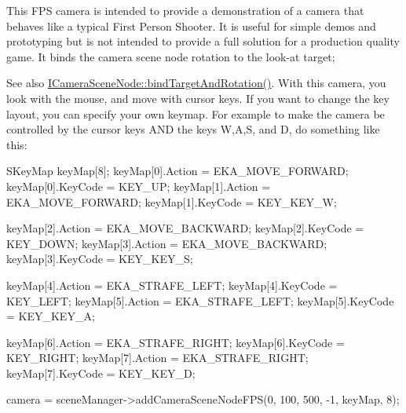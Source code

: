 This F\+PS camera is intended to provide a demonstration of a camera that behaves like a typical First Person Shooter. It is useful for simple demos and prototyping but is not intended to provide a full solution for a production quality game. It binds the camera scene node rotation to the look-\/at target; \begin{DoxySeeAlso}{See also}
\hyperlink{classirr_1_1scene_1_1ICameraSceneNode_ad8785d7b2f730933a8d4425ac54e7205}{I\+Camera\+Scene\+Node\+::bind\+Target\+And\+Rotation()}. With this camera, you look with the mouse, and move with cursor keys. If you want to change the key layout, you can specify your own keymap. For example to make the camera be controlled by the cursor keys A\+ND the keys W,A,S, and D, do something like this\+: 
\begin{DoxyCode}
 SKeyMap keyMap[8];
 keyMap[0].Action = EKA\_MOVE\_FORWARD;
 keyMap[0].KeyCode = KEY\_UP;
 keyMap[1].Action = EKA\_MOVE\_FORWARD;
 keyMap[1].KeyCode = KEY\_KEY\_W;

 keyMap[2].Action = EKA\_MOVE\_BACKWARD;
 keyMap[2].KeyCode = KEY\_DOWN;
 keyMap[3].Action = EKA\_MOVE\_BACKWARD;
 keyMap[3].KeyCode = KEY\_KEY\_S;

 keyMap[4].Action = EKA\_STRAFE\_LEFT;
 keyMap[4].KeyCode = KEY\_LEFT;
 keyMap[5].Action = EKA\_STRAFE\_LEFT;
 keyMap[5].KeyCode = KEY\_KEY\_A;

 keyMap[6].Action = EKA\_STRAFE\_RIGHT;
 keyMap[6].KeyCode = KEY\_RIGHT;
 keyMap[7].Action = EKA\_STRAFE\_RIGHT;
 keyMap[7].KeyCode = KEY\_KEY\_D;

camera = sceneManager->addCameraSceneNodeFPS(0, 100, 500, -1, keyMap, 8);
\end{DoxyCode}
 
\end{DoxySeeAlso}

